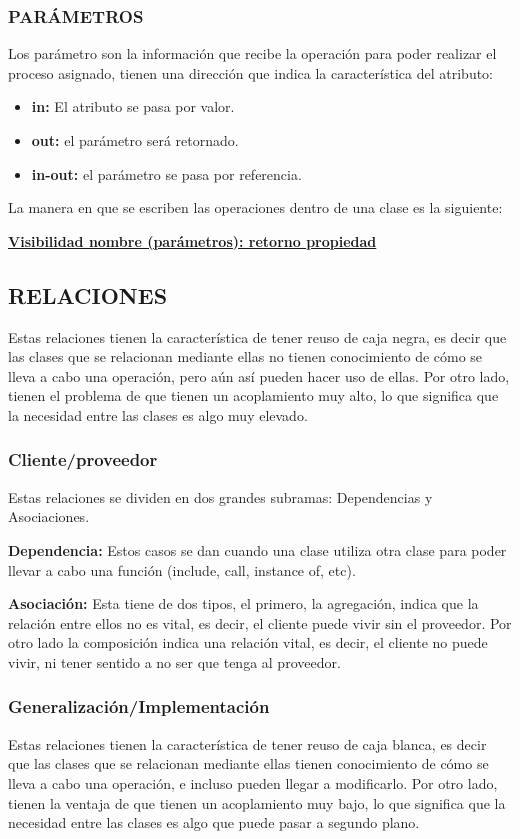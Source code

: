 \subsubsection*{PARÁMETROS}
Los parámetro son la información que recibe la operación para poder realizar el proceso asignado, tienen una dirección que indica la característica del atributo:

\begin{itemize}
	\item{\textbf{in:} El atributo se pasa por valor.}
	\item{\textbf{out:} el parámetro será retornado.}
	\item{\textbf{in-out:} el parámetro se pasa por referencia. }
\end{itemize}

La manera en que se escriben las operaciones dentro de una clase es la siguiente:

\centerline{\textbf{\underline{Visibilidad nombre (parámetros): retorno {propiedad}}}}


\subsection*{RELACIONES}
Estas relaciones tienen la característica de tener reuso de caja negra, es decir que las clases que se relacionan mediante ellas no tienen conocimiento de cómo se lleva a cabo una operación, pero aún así pueden hacer uso de ellas. Por otro lado, tienen el problema de que tienen un acoplamiento muy alto, lo que significa que la necesidad entre las clases es algo muy elevado.

\subsubsection*{Cliente/proveedor}
Estas relaciones se dividen en dos grandes subramas: Dependencias y Asociaciones.

\textbf{Dependencia:}
Estos casos se dan cuando una clase utiliza otra clase para poder llevar a cabo una función (include, call, instance of, etc).

\textbf{Asociación:}
Esta tiene de dos tipos, el primero, la agregación, indica que la relación entre ellos no es vital, es decir, el cliente puede vivir sin el proveedor. Por otro lado la composición indica una relación vital, es decir, el cliente no puede vivir, ni tener sentido a no ser que tenga al proveedor.


\subsubsection*{Generalización/Implementación}
Estas relaciones tienen la característica de tener reuso de caja blanca, es decir que las clases que se relacionan mediante ellas  tienen conocimiento de cómo se lleva a cabo una operación, e incluso pueden llegar a modificarlo. Por otro lado, tienen la ventaja de que tienen un acoplamiento muy bajo, lo que significa que la necesidad entre las clases es algo que puede pasar a segundo plano.

